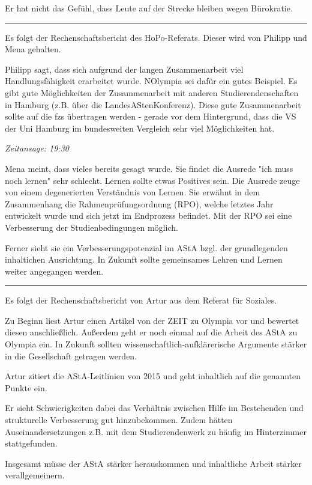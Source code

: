 \documentclass[ngerman,headheight=70pt]{scrartcl}
\begin{document}
    Er hat nicht das Gefühl, dass Leute auf der Strecke bleiben wegen Bürokratie.

    \hrule

    Es folgt der Rechenschaftsbericht des HoPo-Referats. Dieser wird von Philipp
    und Mena gehalten.

    Philipp sagt, dass sich aufgrund der langen Zusammenarbeit viel Handlungsfähigkeit
    erarbeitet wurde. NOlympia sei dafür ein gutes Beispiel. Es gibt gute
    Möglichkeiten der Zusammenarbeit mit anderen Studierendenschaften in Hamburg
    (z.B. über die LandesAStenKonferenz). Diese gute Zusammenarbeit sollte auf
    die fzs übertragen werden - gerade vor dem Hintergrund, dass die VS der Uni
    Hamburg im bundesweiten Vergleich sehr viel Möglichkeiten hat.

    \textit{Zeitansage: 19:30}

    Mena meint, dass vieles bereits gesagt wurde. Sie findet die Ausrede "ich
    muss noch lernen" sehr schlecht. Lernen sollte etwas Positives sein. Die Ausrede
    zeuge von einem degenerierten Verständnis von Lernen. Sie erwähnt in dem
    Zusammenhang die Rahmenprüfungsordnung (RPO), welche letztes Jahr entwickelt wurde
    und sich jetzt im Endprozess befindet. Mit der RPO sei eine Verbesserung der
    Studienbedingungen möglich.

    Ferner sieht sie ein Verbesserungspotenzial im AStA bzgl. der grundlegenden
    inhaltichen Ausrichtung. In Zukunft sollte gemeinsames Lehren und Lernen
    weiter angegangen werden.

    \hrule

    Es folgt der Rechenschaftsbericht von Artur aus dem Referat für Soziales.

    Zu Beginn liest Artur einen Artikel von der ZEIT zu Olympia vor und bewertet
    diesen anschließlich. Außerdem geht er noch einmal auf die Arbeit des AStA
    zu Olympia ein. In Zukunft sollten wissenschaftlich-aufklärerische Argumente
    stärker in die Gesellschaft getragen werden.

    Artur zitiert die AStA-Leitlinien von 2015 und geht inhaltlich auf die
    genannten Punkte ein.

    Er sieht Schwierigkeiten dabei das Verhältnis zwischen Hilfe im Bestehenden
    und strukturelle Verbesserung gut hinzubekommen. Zudem hätten
    Auseinandersetzungen z.B. mit dem Studierendenwerk zu häufig im Hinterzimmer
    stattgefunden.

    Insgesamt müsse der AStA stärker herauskommen und inhaltliche Arbeit
    stärker verallgemeinern.
\end{document}
